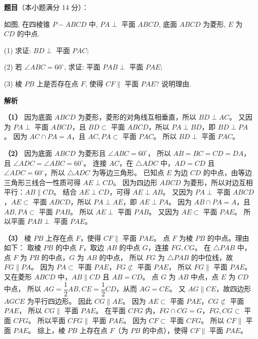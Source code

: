 \begin{answer}

\textbf{题目}（本小题满分 14 分）：

如图, 在四棱锥 $P-ABCD$ 中, $PA \perp$ 平面 $ABCD$, 底面 $ABCD$ 为菱形, $E$ 为 $CD$ 的中点.
\nopagebreak[4]
\begin{center}\end{center}
\nopagebreak[4]
(1) 求证: $BD \perp$ 平面 $PAC$;

(2) 若 $\angle ABC = 60^\circ$, 求证: 平面 $PAB \perp$ 平面 $PAE$;

(3) 棱 $PB$ 上是否存在点 $F$, 使得 $CF \parallel$ 平面 $PAE$? 说明理由.

\textbf{解析}

\textbf{（1）}
因为底面 $ABCD$ 为菱形，菱形的对角线互相垂直，所以 $BD \perp AC$。
又因为 $PA \perp$ 平面 $ABCD$，且 $BD \subset$ 平面 $ABCD$，所以 $PA \perp BD$，即 $BD \perp PA$。
因为 $AC \cap PA = A$，且 $AC, PA \subset$ 平面 $PAC$。
所以 $BD \perp$ 平面 $PAC$。

\textbf{（2）}
因为底面 $ABCD$ 为菱形且 $\angle ABC = 60^\circ$，
所以 $AB = BC = CD = DA$，且 $\angle ADC = \angle ABC = 60^\circ$。
连接 $AC$，在 $\triangle ADC$ 中，$AD = CD$ 且 $\angle ADC = 60^\circ$，所以 $\triangle ADC$ 为等边三角形。
已知点 $E$ 为边 $CD$ 的中点，由等边三角形三线合一性质可得 $AE \perp CD$。
因为四边形 $ABCD$ 为菱形，所以对边互相平行：$AB \parallel CD$。
结合 $AE \perp CD$，可得 $AE \perp AB$。
又因为 $PA \perp$ 平面 $ABCD$，$AE \subset$ 平面 $ABCD$，所以 $PA \perp AE$，即 $AE \perp PA$。
因为 $AB \cap PA = A$，且 $AB, PA \subset$ 平面 $PAB$。
所以 $AE \perp$ 平面 $PAB$。
又因为 $AE \subset$ 平面 $PAE$。
所以平面 $PAB \perp$ 平面 $PAE$。

\textbf{（3）}
棱 $PB$ 上存在点 $F$，使得 $CF \parallel$ 平面 $PAE$。
点 $F$ 为棱 $PB$ 的中点。理由如下：
取棱 $PB$ 的中点 $F$，取边 $AB$ 的中点 $G$，连接 $FG, CG$。
在 $\triangle PAB$ 中，点 $F$ 为 $PB$ 的中点，$G$ 为 $AB$ 的中点，
所以 $FG$ 为 $\triangle PAB$ 的中位线，故 $FG \parallel PA$。
因为 $PA \subset$ 平面 $PAE$，$FG \not\subset$ 平面 $PAE$，
所以 $FG \parallel$ 平面 $PAE$。
又在菱形 $ABCD$ 中，$AB \parallel CD$ 且 $AB = CD$。
点 $G$ 为 $AB$ 中点，点 $E$ 为 $CD$ 中点，
所以 $AG = \dfrac{1}{2}AB, CE = \dfrac{1}{2}CD$，从而 $AG = CE$。
又 $AG \parallel CE$，故四边形 $AGCE$ 为平行四边形。
因此 $CG \parallel AE$。
因为 $AE \subset$ 平面 $PAE$，$CG \not\subset$ 平面 $PAE$，
所以 $CG \parallel$ 平面 $PAE$。
在平面 $CFG$ 内，$FG \cap CG = G$，$FG, CG \subset$ 平面 $CFG$。
所以平面 $CFG \parallel$ 平面 $PAE$。
因为 $CF \subset$ 平面 $CFG$。
所以 $CF \parallel$ 平面 $PAE$。
综上，棱 $PB$ 上存在点 $F$（为 $PB$ 的中点），使得 $CF \parallel$ 平面 $PAE$。




\end{answer}

